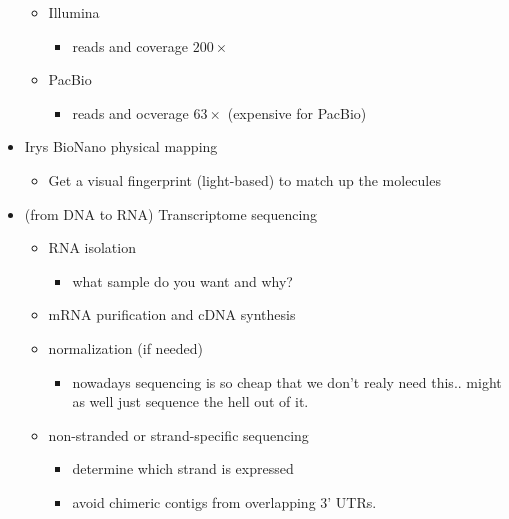 \documentclass{article}
\newcommand{\fold}[1]{$#1\times$}
\begin{document}
\begin{itemize}
\begin{itemize}
            \item Illumina
            \begin{itemize}
                \item reads and coverage \fold{200}
            \end{itemize}
            \item PacBio
            \begin{itemize}
                \item reads and ocverage \fold{63} (expensive for PacBio)
            \end{itemize}
        \end{itemize}
        \item Irys BioNano physical mapping
        \begin{itemize}
            \item Get a visual fingerprint (light-based) to match up the molecules
        \end{itemize}
        \item (from DNA to RNA) Transcriptome sequencing
        \begin{itemize}
            \item RNA isolation
            \begin{itemize}
                \item what sample do you want and why?
            \end{itemize}
            \item mRNA purification and cDNA synthesis
            \item normalization (if needed)
            \begin{itemize}
                \item nowadays sequencing is so cheap that we don't realy need this.. might as well just sequence the hell out of it.
            \end{itemize}
            \item non-stranded or strand-specific sequencing
            \begin{itemize}
                \item determine which strand is expressed
                \item avoid chimeric contigs from overlapping 3' UTRs.
            \end{itemize}
        \end{itemize}
    \end{itemize}
\end{document}
